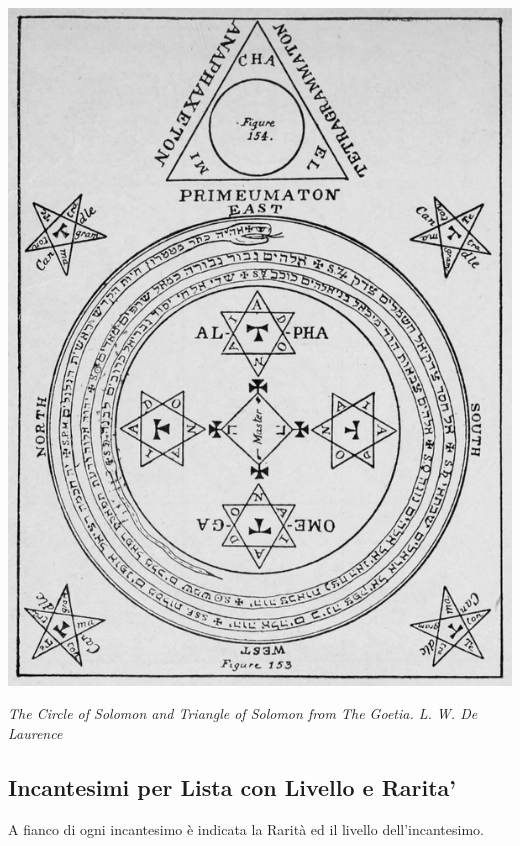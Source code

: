 \vfill

\begin{center}
\includegraphics[keepaspectratio,width=0.4\linewidth]{immagini/Goetic_circle_from_The_Lesser_Key_of_Solomon.png}

\medskip

\emph{The Circle of Solomon and Triangle of Solomon from The Goetia. L. W. De Laurence}
\end{center}

\pagebreak

\subsection{Incantesimi per Lista con Livello e Rarita'}\hypertarget{elencoscuole}{}

A fianco di ogni incantesimo è indicata la Rarità ed il livello dell'incantesimo.

